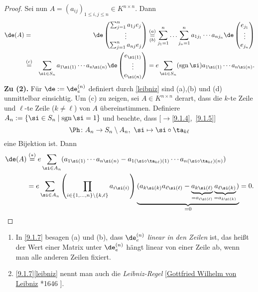 \documentclass[../../main.tex]{subfiles}
\begin{document}
\begin{proof}
Sei nun $A=(a_{ij})_{1\le i,j\le n}\in K^{n\times n}$. Dann
\begin{eqnarray*}
\de(A)&=&\de\begin{pmatrix}\sum_{j=1}^na_{1j}e_j\\\vdots\\\sum_{j=1}^na_{nj}e_j\end{pmatrix}\overset{(a)}{\underset{(b)}=}
\sum_{j_1=1}^n\ldots\sum_{j_n=1}^na_{1j_1}\dotsm a_{nj_n}\de\begin{pmatrix}e_{j_1}\\\vdots\\e_{j_n}\end{pmatrix}\\
&\overset{(c)}=&\sum_{\si\in S_n}a_{1\si(1)}\dotsm a_{n\si(n)}\de\begin{pmatrix}e_{\si(1)}\\\vdots\\e_{\si(n)}\end{pmatrix}=
e\sum_{\si\in S_n}(\sgn\si)a_{1\si(1)}\dotsm a_{n\si(n)}.
\end{eqnarray*}
\textbf{Zu (2).} Für $\de:=\de_e^{(n)}$ definiert durch \eqref{leibniz} sind (a),(b) und (d) unmittelbar einsichtig. Um (c) zu zeigen, sei $A\in K^{n\times n}$
derart, dass die $k$-te Zeile und $\ell$-te Zeile ($k\ne\ell$) von $A$ übereinstimmen. Definiere $A_n:=\{\si\in S_n\mid\sgn\si=1\}$ und beachte, dass
[$\to$\ref{9.1.4},~\ref{9.1.5}]
\[\Ph\colon A_n\to S_n\setminus A_n,\ \si\mapsto\si\circ\ta_{k\ell}\] eine Bijektion ist. Dann
\begin{align*}
\de(A)&\overset{(*)}=e\sum_{\si\in A_n}(a_{1\si(1)}\dotsm a_{n\si(n)}-a_{1(\si\circ\ta_{k\ell})(1)}\dotsm a_{n(\si\circ\ta_{k\ell})(n)})\\
&=e\sum_{\si\in A_n}\left(\prod_{i\in\{1,\dots,n\}\setminus\{k,\ell\}}a_{i\si(i)}\right)
\underbrace{(a_{k\si(k)}a_{\ell\si(\ell)}-\underbrace{a_{k\si(\ell)}}_{=a_{\ell\si(\ell)}}
\underbrace{a_{\ell\si(k)}}_{=a_{k\si(k)}})}_{=0}=0.
\end{align*}
\end{proof}

\begin{bem}\label{9.1.8}
\begin{enumerate}[\normalfont(a)]
\item In \ref{9.1.7} besagen (a) und (b), dass $\de_e^{(n)}$ \emph{linear in den Zeilen} ist, das heißt der Wert einer Matrix unter $\de_e^{(n)}$ hängt linear von einer
Zeile ab, wenn man alle anderen Zeilen fixiert.
\item \ref{9.1.7}\eqref{leibniz} nennt man auch die \emph{Leibniz-Regel} [\href{http://de.wikipedia.org/wiki/Gottfried_Wilhelm_Leibniz}{Gottfried Wilhelm von Leibniz} *1646 ].
\end{enumerate}
\end{bem}
\end{document}
